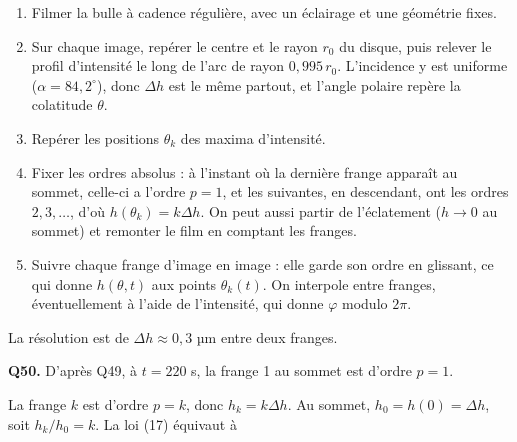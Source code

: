 \documentclass[11pt,a4paper]{article}
\providecommand{\tightlist}{\setlength{\itemsep}{0pt}\setlength{\parskip}{0pt}}
\newcommand{\equationajustee}[1]{%
  \sbox{\boiteequation}{$\displaystyle #1$}%
  \ifdim\wd\boiteequation>\linewidth
    \[\resizebox{\linewidth}{!}{\usebox{\boiteequation}}\]%
  \else
    \[#1\]%
  \fi}
\begin{document}
\begin{enumerate}
\def\labelenumi{\arabic{enumi}.}
\tightlist
\item
  Filmer la bulle à cadence régulière, avec un éclairage et une géométrie fixes.
\item
  Sur chaque image, repérer le centre et le rayon \(r_0\) du disque, puis relever le profil d'intensité le long de l'arc de rayon \(0{,}995\,r_0\). L'incidence y est uniforme (\(\alpha=84{,}2^\circ\)), donc \(\Delta h\) est le même partout, et l'angle polaire repère la colatitude \(\theta\).
\item
  Repérer les positions \(\theta_k\) des maxima d'intensité.
\item
  Fixer les ordres absolus : à l'instant où la dernière frange apparaît au sommet, celle-ci a l'ordre \(p=1\), et les suivantes, en descendant, ont les ordres \(2,3,\dots\), d'où \(h(\theta_k)=k\Delta h\). On peut aussi partir de l'éclatement (\(h\to0\) au sommet) et remonter le film en comptant les franges.
\item
  Suivre chaque frange d'image en image : elle garde son ordre en glissant, ce qui donne \(h(\theta,t)\) aux points \(\theta_k(t)\). On interpole entre franges, éventuellement à l'aide de l'intensité, qui donne \(\varphi\) modulo \(2\pi\).
\end{enumerate}

La résolution est de \(\Delta h\approx0{,}3\) µm entre deux franges.

\textbf{Q50.} D'après Q49, à \(t=220\) s, la frange 1 au sommet est d'ordre \(p=1\).

La frange \(k\) est d'ordre \(p=k\), donc \(h_k=k\Delta h\). Au sommet, \(h_0=h(0)=\Delta h\), soit \(h_k/h_0=k\). La loi (17) équivaut à

\equationajustee{\ln k=\ell\,\big[-\ln\cos\theta_k\big].}
\end{document}
